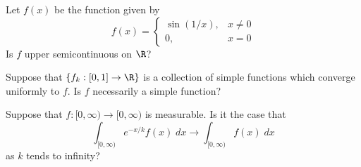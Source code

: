 \begin{quiz}
Let $f(x)$ be the function given by
	\[
	f(x)=
	\begin{cases}
	\sin(1/x), & x \neq 0 \\
	0, & x=0
	\end{cases}
	\]
Is $f$ upper semicontinuous on $\R$?
\end{quiz}


\begin{quiz}
Suppose that $\{f_k: [0,1] \to \R \}$ is a collection of simple functions which converge uniformly to $f$. Is $f$ necessarily a simple function? 
\end{quiz}










\begin{quiz}
Suppose that $f: [0,\infty) \to [0,\infty)$ is measurable. Is it the case that
	\[
	\int_{[0,\infty)} e^{-x/k} f(x) \; dx \longrightarrow \int_{[0,\infty)} f(x) \; dx 
	\]
as $k$ tends to infinity?
\end{quiz}























